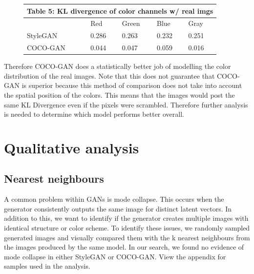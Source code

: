 \documentclass{article}
\begin{document}
        \begin{figure}[H]
            \centering
            \begin{tabular}{ |p{2cm}|p{1cm}|p{1cm}|p{1cm}|p{1cm}|  }
                 \hline
                 \multicolumn{5}{|c|}{Table 5: KL divergence of color channels w/ real imgs} \\
                 \hline
                & Red & Green & Blue & Gray  \\
                \hline
                StyleGAN & 0.286    & 0.263      & 0.232     &  0.251 \\
                \hline
                COCO-GAN  & 0.044    & 0.047      & 0.059     &  0.016\\
                \hline
            \end{tabular}
        \end{figure}
        
        Therefore COCO-GAN does a statistically better job of modelling the color distribution of the real images. Note that this does not guarantee that COCO-GAN is superior because this method of comparison does not take into account the spatial position of the colors. This means that the images would post the same KL Divergence even if the pixels were scrambled. Therefore further analysis is needed to determine which model performs better overall.
        \section{Qualitative analysis}
        \label{sec:qualitative}
        \subsection{Nearest neighbours}
        \label{subsec:nearestneighbours}
        A common problem within GANs is mode collapse.
        This occurs when the generator consistently outputs the same image for distinct latent vectors.
        In addition to this, we want to identify if the generator creates multiple images with identical structure or color scheme.
        To identify these issues, we randomly sampled generated images and visually compared them with the k nearest neighbours from the images produced by the same model.
        In our search, we found no evidence of mode collapse in either StyleGAN or COCO-GAN. View the appendix for samples used in the analysis.
\end{document}
